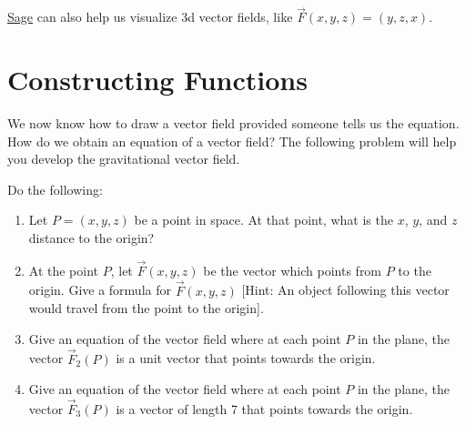 

\href{http://aleph.sagemath.org/?z=eJxz06jQqdSp0lSwVdAA0joVmlwFOfkl8WWpySX5RfFpmak5KcYpGm46CkCFusY6xpo6IIUQlkYVhKEJAOGFExs}{Sage} can also help us visualize 3d vector fields, like $\vec F(x,y,z)=(y,z,x)$. 

\section{Constructing Functions}
We now know how to draw a vector field provided someone tells us the equation. How do we obtain an equation of a vector field? The following problem will help you develop the gravitational vector field.

\begin{problem}
%
Do the following:
\begin{enumerate}
	\item Let $P=(x,y,z)$ be a point in space. At that point, what is the $x$, $y$, and $z$ distance to the origin?
	\item At the point $P$, let $\vec F(x,y,z)$ be the vector which points from $P$ to the origin.  Give a formula for $\vec F(x,y,z)$ [Hint: An object following this vector would travel from the point to the origin].
	\item Give an equation of the vector field where at each point $P$ in the plane, the vector $\vec F_2(P)$ is a unit vector that points towards the origin.
 \item Give an equation of the vector field where at each point $P$ in the plane, the vector $\vec F_3(P)$ is a vector of length 7 that points towards the origin.
\end{enumerate}
\end{problem}

